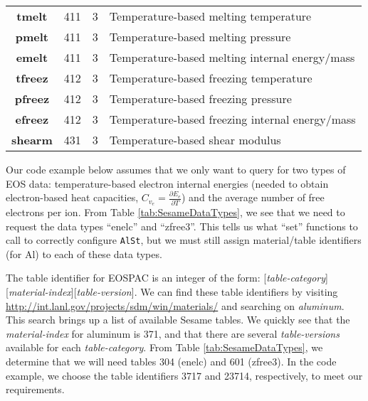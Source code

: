 \documentclass[11pt]{nmemo}
\begin{document}
\begin{table}[!ht]
\begin{center}
\begin{tabularx}{0.9\linewidth}{CDDL}
            
            \textbf{tmelt} & 411 & 3 & Temperature-based melting temperature\\
            \textbf{pmelt} & 411 & 3 & Temperature-based melting pressure\\
            \textbf{emelt} & 411 & 3 & Temperature-based melting internal energy/mass\\
            
            
            \textbf{tfreez} & 412 & 3 & Temperature-based freezing temperature\\
            \textbf{pfreez} & 412 & 3 & Temperature-based freezing pressure\\
            \textbf{efreez} & 412 & 3 & Temperature-based freezing internal energy/mass\\
            
            
            \textbf{shearm} & 431 & 3 & Temperature-based shear modulus\\

    \end{tabularx}
  \end{center}
  \normalsize
\end{table}

Our code example below assumes that we only want to query for two
types of EOS data: temperature-based electron internal energies
(needed to obtain electron-based heat capacities, $C_{v_e} =
\frac{\partial E_e} {\partial T}$) and the average number of free
electrons per ion.  From Table \ref{tab:SesameDataTypes}, we see that
we need to request the data types ``enelc'' and ``zfree3''.  This
tells us what ``set'' functions to call to correctly configure
\texttt{AlSt}, but we must still assign material/table identifiers
(for Al) to each of these data types.

The table identifier for EOSPAC is an integer of the form:
[\emph{table-category}][\emph{material-index}][\emph{table-version}].
We can find these table identifiers by visiting
\url{http://int.lanl.gov/projects/sdm/win/materials/} and searching on
\emph{aluminum}.  This search brings up a list of available Sesame
tables.  We quickly see that the \emph{material-index} for aluminum is
371, and that there are several \emph{table-versions} available for
each \emph{table-category}. From Table \ref{tab:SesameDataTypes}, we
determine that we will need tables 304 (enelc) and 601 (zfree3).  In
the code example, we choose the table identifiers 3717 and 23714,
respectively, to meet our requirements.
\end{document}
